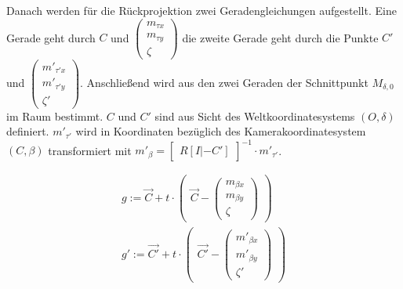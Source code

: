 Danach werden für die Rückprojektion zwei Geradengleichungen aufgestellt. Eine Gerade geht durch $C$ und $	\begin{pmatrix}
m_{\tau x} \\
m_{\tau y}\\
\zeta
\end{pmatrix} $ die zweite Gerade geht durch die Punkte $C'$ und $	\begin{pmatrix}
m'_{\tau' x} \\
m'_{\tau' y}\\
\zeta'
\end{pmatrix}$. Anschließend wird aus den zwei Geraden der Schnittpunkt $M_{\delta,0}$ im Raum bestimmt. $C$ und $C'$ sind aus Sicht des Weltkoordinatesystems $(O,\delta)$ definiert. $m'_{\tau'}$ wird in Koordinaten bezüglich des Kamerakoordinatesystem $(C,\beta)$ transformiert mit $m'_\beta = \begin{bmatrix}
R[I|-C']
\end{bmatrix}^{-1} \cdot m'_{\tau'}$.



\begin{gather}
	 g:= \vec{C} + t \cdot 
	\begin{pmatrix}
	 	\vec{C} -	
	\begin{pmatrix}	
	m_{\beta x} \\
	m_{\beta y}\\
	\zeta
	\end{pmatrix}
 \end{pmatrix} \\
g' := \vec{C'} + t \cdot 
\begin{pmatrix}
	\vec{C'} -
	\begin{pmatrix}
	m'_{\beta x} \\
	m'_{\beta y}\\
	\zeta'
	\end{pmatrix}
\end{pmatrix}
\end{gather}


 
%

